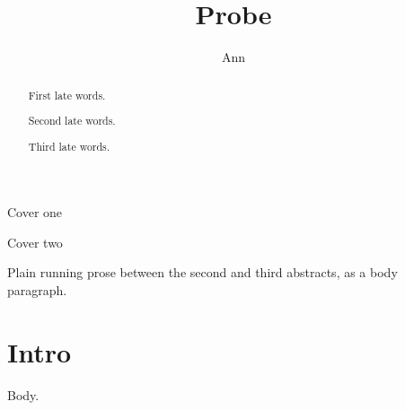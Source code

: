 \documentclass{article}
\begin{document}
\title{Probe}\author{Ann}
\maketitle
\begin{center}Cover one\end{center}
\begin{abstract}First late words.\end{abstract}
\begin{center}Cover two\end{center}
\begin{abstract}Second late words.\end{abstract}
Plain running prose between the second and third abstracts, as a body paragraph.

\begin{abstract}Third late words.\end{abstract}
\section{Intro}
Body.
\end{document}
